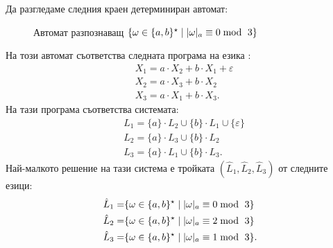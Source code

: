 \begin{example}
  Да разгледаме следния краен детерминиран автомат:
  \begin{figure}[H]
    \centering
    \caption{Автомат разпознаващ $\{\omega \in \{a,b\}^\star \mid \abs{\omega}_{a} \equiv 0 \bmod\ 3\}$}
  \end{figure}
  \noindent
  На този автомат съответства следната програма на езика \REG:
  \begin{align*}
    & X_1 = a \cdot X_2 + b \cdot X_1 + \varepsilon \\
    & X_2 = a \cdot X_3 + b \cdot X_2\\
    & X_3 = a \cdot X_1 + b \cdot X_3.
  \end{align*}
  На тази програма съответства системата:
  \begin{align*}
    & L_1 = \{a\} \cdot L_2 \cup \{b\} \cdot L_1 \cup \{\varepsilon\}\\
    & L_2 = \{a\} \cdot L_3 \cup \{b\} \cdot L_2\\
    & L_3 = \{a\} \cdot L_1 \cup \{b\} \cdot L_3.
  \end{align*}
  Най-малкото решение на тази система е тройката $(\hat{L}_1,\hat{L}_2,\hat{L}_3)$ от следните езици:
  \begin{align*}
    \hat{L}_1 = & \{\omega \in \{a,b\}^\star \mid \vert{\omega}\vert_{a} \equiv 0 \bmod\ 3\}\\
    \hat{L}_2 = & \{\omega \in \{a,b\}^\star \mid \vert{\omega}\vert_{a} \equiv 2 \bmod\ 3\}\\
    \hat{L}_3 = & \{\omega \in \{a,b\}^\star \mid \vert{\omega}\vert_{a} \equiv 1 \bmod\ 3\}.
  \end{align*}
\end{example}

